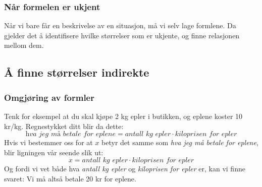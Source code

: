 \subsubsection{Når formelen er ukjent}
Når vi bare får en beskrivelse av en situasjon, må vi selv lage formlene. Da gjelder det å identifisere hvilke størrelser som er ukjente, og finne relasjonen mellom dem.\regv
{}

\subsection{Å finne størrelser indirekte}
\subsubsection{Omgjøring av formler}
\newpage
Tenk for eksempel at du skal kjøpe 2 kg epler i butikken, og eplene koster 10 kr/kg. Regnestykket ditt blir da dette:
\small
\[ \textit{hva jeg må betale for eplene}=\textit{antall kg epler}\cdot \textit{kiloprisen for epler} \]
\normalsize
Hvis vi bestemmer oss for at $ x $ betyr det samme som \textit{hva jeg må betale for eplene}, blir ligningen vår seende slik ut:
\[ x=\textit{antall kg epler}\cdot \textit{kiloprisen for epler} \]
Og fordi vi vet både hva \textit{antall kg epler} og \textit{kiloprisen for epler} er, kan vi finne svaret:\vs
{}
Vi må altså betale 20 kr for eplene. \vsk 

